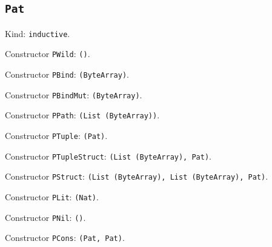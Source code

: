 \documentclass[11pt]{article}
\begin{document}
\subsection*{\texttt{Pat}}
\noindent Kind: \texttt{inductive}.\par
\noindent Constructor \texttt{PWild}: \texttt{()}.\par
\noindent Constructor \texttt{PBind}: \texttt{(ByteArray)}.\par
\noindent Constructor \texttt{PBindMut}: \texttt{(ByteArray)}.\par
\noindent Constructor \texttt{PPath}: \texttt{(List (ByteArray))}.\par
\noindent Constructor \texttt{PTuple}: \texttt{(Pat)}.\par
\noindent Constructor \texttt{PTupleStruct}: \texttt{(List (ByteArray), Pat)}.\par
\noindent Constructor \texttt{PStruct}: \texttt{(List (ByteArray), List (ByteArray), Pat)}.\par
\noindent Constructor \texttt{PLit}: \texttt{(Nat)}.\par
\noindent Constructor \texttt{PNil}: \texttt{()}.\par
\noindent Constructor \texttt{PCons}: \texttt{(Pat, Pat)}.\par
\end{document}
